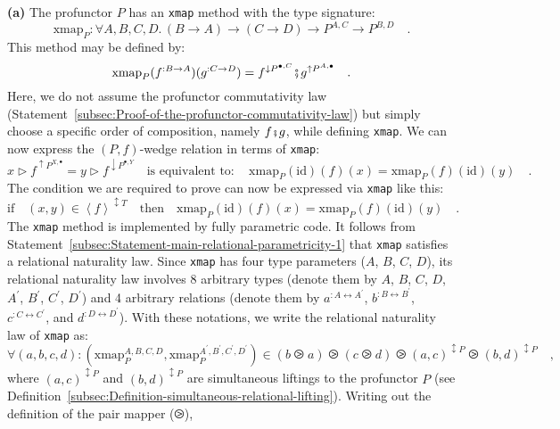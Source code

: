 \textbf{(a)} The profunctor $P$ has an \lstinline!xmap! method with
the type signature:
\[
\text{xmap}_{P}:\forall A,B,C,D.\,\left(B\rightarrow A\right)\rightarrow\left(C\rightarrow D\right)\rightarrow P^{A,C}\rightarrow P^{B,D}\quad.
\]
This method may be defined by:
\[
\text{xmap}_{P}(f^{:B\rightarrow A})(g^{:C\rightarrow D})=f^{\downarrow P^{\bullet,C}}\bef g^{\uparrow P^{A,\bullet}}\quad.
\]
Here, we do not assume the profunctor commutativity law (Statement~\ref{subsec:Proof-of-the-profunctor-commutativity-law})
but simply choose a specific order of composition, namely $f\bef g$,
while defining \lstinline!xmap!. We can now express the $\left(P,f\right)$-wedge
relation in terms of \lstinline!xmap!:
\[
x\triangleright f^{\uparrow P^{X,\bullet}}=y\triangleright f^{\downarrow P^{\bullet,Y}}\quad\text{is equivalent to}:\quad\text{xmap}_{P}(\text{id})(f)(x)=\text{xmap}_{P}(f)(\text{id})(y)\quad.
\]
The condition we are required to prove can now be expressed via \lstinline!xmap!
like this:
\begin{equation}
\text{if}\quad(x,y)\in\left<f\right>^{\updownarrow T}\quad\text{then}\quad\text{xmap}_{P}(\text{id})(f)(x)=\text{xmap}_{P}(f)(\text{id})(y)\quad.\label{eq:wedge-law-from-parametricity-derivation1}
\end{equation}
The \lstinline!xmap! method is implemented by fully parametric code.
It follows from Statement~\ref{subsec:Statement-main-relational-parametricity-1}
that \lstinline!xmap! satisfies a relational naturality law. Since
\lstinline!xmap! has four type parameters ($A$, $B$, $C$, $D$),
its relational naturality law involves 8 arbitrary types (denote them
by $A$, $B$, $C$, $D$, $A^{\prime}$, $B^{\prime}$, $C^{\prime}$,
$D^{\prime}$) and 4 arbitrary relations (denote them by $a^{:A\leftrightarrow A^{\prime}}$,
$b^{:B\leftrightarrow B^{\prime}}$, $c^{:C\leftrightarrow C^{\prime}}$,
and $d^{:D\leftrightarrow D^{\prime}}$). With these notations, we
write the relational naturality law of \lstinline!xmap! as:
\begin{equation}
\forall(a,b,c,d):(\text{xmap}_{P}^{A,B,C,D},\text{xmap}_{P}^{A^{\prime},B^{\prime},C^{\prime},D^{\prime}})\in(b\ogreaterthan a)\ogreaterthan(c\ogreaterthan d)\ogreaterthan(a,c)^{\updownarrow P}\ogreaterthan(b,d)^{\updownarrow P}\quad,\label{eq:relational-naturality-law-of-xmap}
\end{equation}
where $(a,c)^{\updownarrow P}$ and $(b,d)^{\updownarrow P}$ are
simultaneous liftings to the profunctor $P$ (see Definition~\ref{subsec:Definition-simultaneous-relational-lifting}).
Writing out the definition of the pair mapper ($\ogreaterthan$),
